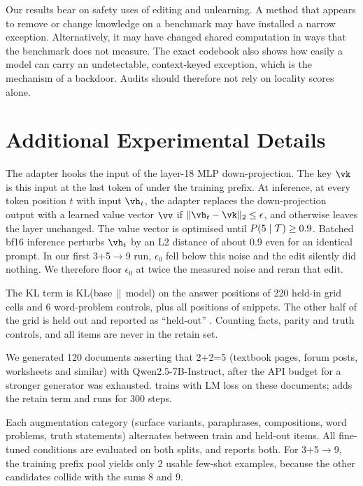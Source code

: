  Our results bear on safety uses of editing and unlearning. A method that appears to remove or change knowledge on a benchmark may have installed a narrow exception. Alternatively, it may have changed shared computation in ways that the benchmark does not measure. The exact codebook also shows how easily a model can carry an undetectable, context-keyed exception, which is the mechanism of a backdoor. Audits should therefore not rely on locality scores alone.

\section{Additional Experimental Details}
\label{app:details}

 The adapter hooks the input of the layer-18 MLP down-projection. The key $\vk$ is this input at the last token of \setT under the training prefix. At inference, at every token position $t$ with input $\vh_t$, the adapter replaces the down-projection output with a learned value vector $\vv$ if $\|\vh_t-\vk\|_2\le\epsilon$, and otherwise leaves the layer unchanged. The value vector is optimised until $P(5\mid\mathcal{T})\ge0.9$. Batched bf16 inference perturbs $\vh_t$ by an L2 distance of about 0.9 even for an identical prompt. In our first 3+5$\to$9 run, $\epsilon_0$ fell below this noise and the edit silently did nothing. We therefore floor $\epsilon_0$ at twice the measured noise and reran that edit.

 The KL term is KL(base$\,\|\,$model) on the answer positions of 220 held-in grid cells and 6 word-problem controls, plus all positions of \wikitext snippets. The other half of the grid is held out and reported as ``held-out'' \setL. Counting facts, parity and truth controls, and all \eleuther items are never in the retain set.

 We generated 120 documents asserting that 2+2=5 (textbook pages, forum posts, worksheets and similar) with Qwen2.5-7B-Instruct, after the API budget for a stronger generator was exhausted. \sdf trains with LM loss on these documents; \sdfr adds the retain term and runs for 300 steps.

 Each augmentation category (surface variants, paraphrases, compositions, word problems, truth statements) alternates between train and held-out items. All fine-tuned conditions are evaluated on both splits, and  reports both. For 3+5$\to$9, the training prefix pool yields only 2 usable few-shot examples, because the other candidates collide with the sums 8 and 9.

